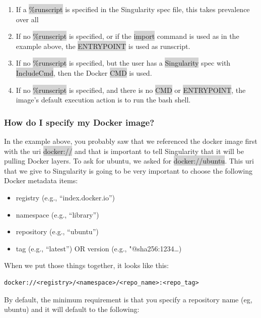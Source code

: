 \documentclass[a4paper]{article}
\begin{document}
\begin{enumerate}
\item If a \colorbox{lightgray}{\%runscript} is specified in the Singularity spec file, this takes prevalence over all
\item If no \colorbox{lightgray}{\%runscript} is specified, or if the \colorbox{lightgray}{import} command is used as in the example above, the \colorbox{lightgray}{ENTRYPOINT} is used as runscript.
\item If no \colorbox{lightgray}{\%runscript} is specified, but the user has a \colorbox{lightgray}{Singularity} spec with \colorbox{lightgray}{IncludeCmd}, then the Docker \colorbox{lightgray}{CMD} is used.
\item If no \colorbox{lightgray}{\%runscript} is specified, and there is no \colorbox{lightgray}{CMD} or \colorbox{lightgray}{ENTRYPOINT}, the image’s default execution action is to run the bash shell.
\end{enumerate}


\subsubsection{How do I specify my Docker image?}

In the example above, you probably saw that we referenced the docker image first with the uri \colorbox{lightgray}{docker://} and that is important to tell Singularity that it will be pulling Docker layers. To ask for ubuntu, we asked for \colorbox{lightgray}{docker://ubuntu}. This uri that we give to Singularity is going to be very important to choose the following Docker metadata items:

\begin{itemize}
\item registry (e.g., “index.docker.io”)
\item namespace (e.g., “library”)
\item repository (e.g., “ubuntu”)
\item tag (e.g., “latest”) OR version (e.g., "@sha256:1234…)
\end{itemize}

When we put those things together, it looks like this:

\begin{lstlisting}[frame=single] 
docker://<registry>/<namespace>/<repo_name>:<repo_tag>
\end{lstlisting}

By default, the minimum requirement is that you specify a repository name (eg, ubuntu) and it will default to the following:
\end{document}
